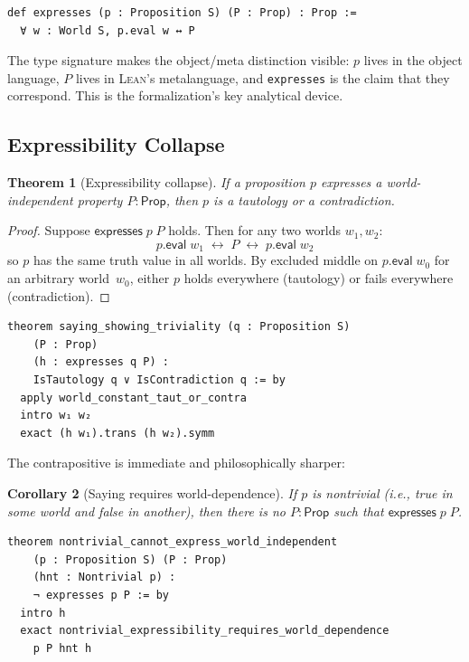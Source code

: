\documentclass[jsl,bibother]{asl}
\newtheorem{theorem}{Theorem}[section]
\newtheorem{corollary}[theorem]{Corollary}
\theoremstyle{definition}
\theoremstyle{remark}
\newcommand{\Prop}{\mathsf{Prop}}
\newcommand{\eval}{\mathsf{eval}}
\newcommand{\expresses}{\mathsf{expresses}}
\newcommand{\Lean}{\textsc{Lean}}
\begin{document}
\begin{lstlisting}
def expresses (p : Proposition S) (P : Prop) : Prop :=
  ∀ w : World S, p.eval w ↔ P
\end{lstlisting}

\noindent
The type signature makes the object/meta distinction visible:
$p$ lives in the object language, $P$ lives in \Lean's
metalanguage, and \texttt{expresses} is the claim that they
correspond.  This is the formalization's key analytical device.

\subsection{Expressibility Collapse}
\label{sec:collapse}

\begin{theorem}[Expressibility collapse]
\label{thm:collapse}
If a proposition $p$ expresses a world-independent property
$P : \Prop$, then $p$ is a tautology or a contradiction.
\end{theorem}

\begin{proof}
Suppose $\expresses\;p\;P$ holds.  Then for any two worlds
$w_1, w_2$:
\[
  p.\eval\;w_1 \;\leftrightarrow\; P \;\leftrightarrow\;
  p.\eval\;w_2
\]
so $p$ has the same truth value in all worlds.  By excluded
middle on $p.\eval\;w_0$ for an arbitrary world~$w_0$, either
$p$ holds everywhere (tautology) or fails everywhere
(contradiction).
\end{proof}

\begin{lstlisting}
theorem saying_showing_triviality (q : Proposition S)
    (P : Prop)
    (h : expresses q P) :
    IsTautology q ∨ IsContradiction q := by
  apply world_constant_taut_or_contra
  intro w₁ w₂
  exact (h w₁).trans (h w₂).symm
\end{lstlisting}

\noindent
The contrapositive is immediate and philosophically sharper:

\begin{corollary}[Saying requires world-dependence]
\label{cor:nontrivial}
If $p$ is nontrivial (i.e., true in some world and false in
another), then there is no $P : \Prop$ such that
$\expresses\;p\;P$.
\end{corollary}

\begin{lstlisting}[basicstyle=\ttfamily\footnotesize]
theorem nontrivial_cannot_express_world_independent
    (p : Proposition S) (P : Prop)
    (hnt : Nontrivial p) :
    ¬ expresses p P := by
  intro h
  exact nontrivial_expressibility_requires_world_dependence
    p P hnt h
\end{lstlisting}
\end{document}
